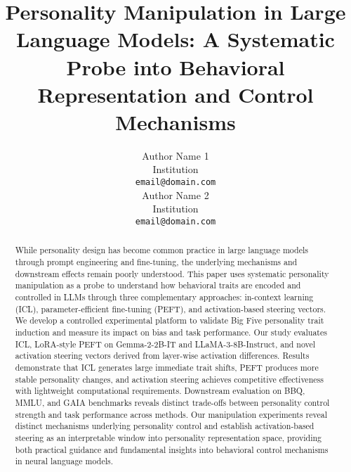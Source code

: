 \documentclass[11pt]{article}
\title{Personality Manipulation in Large Language Models: A Systematic Probe into Behavioral Representation and Control Mechanisms}
\author{Author Name 1 \\
  Institution \\
  \texttt{email@domain.com} \\\And
  Author Name 2 \\
  Institution \\
  \texttt{email@domain.com} \\}
\begin{document}
\maketitle
\begin{abstract}
While personality design has become common practice in large language models through prompt engineering and fine-tuning, the underlying mechanisms and downstream effects remain poorly understood. This paper uses systematic personality manipulation as a probe to understand how behavioral traits are encoded and controlled in LLMs through three complementary approaches: in-context learning (ICL), parameter-efficient fine-tuning (PEFT), and activation-based steering vectors. We develop a controlled experimental platform to validate Big Five personality trait induction and measure its impact on bias and task performance. Our study evaluates ICL, LoRA-style PEFT on Gemma-2-2B-IT and LLaMA-3-8B-Instruct, and novel activation steering vectors derived from layer-wise activation differences. Results demonstrate that ICL generates large immediate trait shifts, PEFT produces more stable personality changes, and activation steering achieves competitive effectiveness with lightweight computational requirements. Downstream evaluation on BBQ, MMLU, and GAIA benchmarks reveals distinct trade-offs between personality control strength and task performance across methods. Our manipulation experiments reveal distinct mechanisms underlying personality control and establish activation-based steering as an interpretable window into personality representation space, providing both practical guidance and fundamental insights into behavioral control mechanisms in neural language models.
\end{abstract}






\appendix













\end{document}
